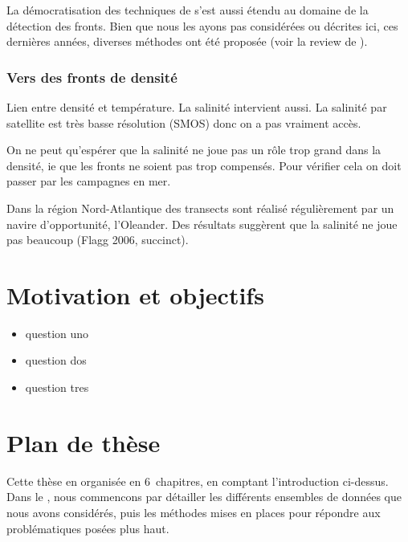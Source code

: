 \begin{note}
  La démocratisation des techniques de  s'est aussi étendu au domaine de la détection des fronts.
  Bien que nous les ayons pas considérées ou décrites ici, ces dernières années, diverses méthodes ont été proposée (voir la review de \cite{liu_2022}).
\end{note}

\subsubsection{Vers des fronts de densité}

Lien entre densité et température.
La salinité intervient aussi. La salinité par satellite est très basse résolution (SMOS) donc on a pas vraiment accès.

On ne peut qu'espérer que la salinité ne joue pas un rôle trop grand dans la densité, ie que les fronts ne soient pas trop compensés.
Pour vérifier cela on doit passer par les campagnes en mer.

Dans la région Nord-Atlantique des transects sont réalisé régulièrement par un navire d'opportunité, l'Oleander.
Des résultats suggèrent que la salinité ne joue pas beaucoup (Flagg 2006, succinct).

\section{Motivation et objectifs}
\label{sec:problematique}

\begingroup
{}
\begin{itemize}
        \setlength{\topsep}{\baselineskip}
        \setlength{\itemsep}{\baselineskip}
        \renewcommand*\labelitemi{\adfrightarrowhead}
  \item question uno
  \item question dos
  \item question tres
\end{itemize}
\endgroup

\section{Plan de thèse}
\label{sec:plan-de-these}

Cette thèse en organisée en 6~chapitres, en comptant l'introduction ci-dessus.
Dans le , nous commencons par détailler les différents ensembles de données que nous avons considérés, puis les méthodes mises en places pour répondre aux problématiques posées plus haut.

